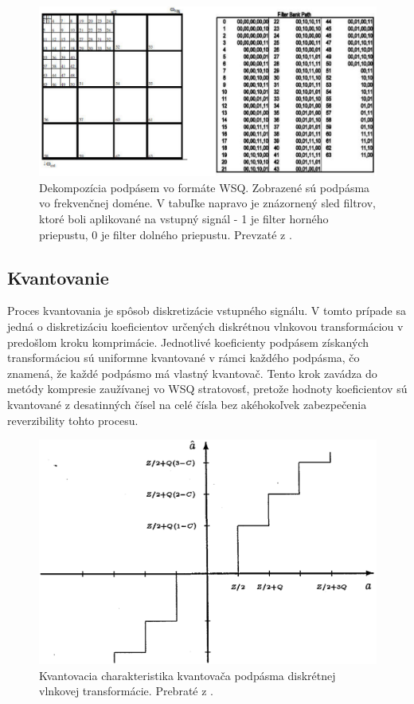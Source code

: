   \begin{figure}[h]
    \centering
    \includegraphics[width=0.8\linewidth]{obrazky-figures/WSQ_DWT_subband_decomposition.png}
    \caption{Dekompozícia podpásem vo formáte WSQ. Zobrazené sú podpásma vo frekvenčnej doméne. V tabuľke napravo je znázornený sled filtrov, ktoré boli
    aplikované na vstupný signál - 1 je filter horného priepustu, 0 je filter dolného priepustu. Prevzaté z \cite{WSQSpecification}.}
    \label{obr:WSQ_DWT_dekompozicia}
  \end{figure}

  \subsection{Kvantovanie}
  Proces kvantovania je spôsob diskretizácie vstupného signálu. V tomto prípade sa jedná o diskretizáciu koeficientov určených diskrétnou vlnkovou
  transformáciou v predošlom kroku komprimácie. Jednotlivé koeficienty podpásem získaných transformáciou sú uniformne kvantované v rámci každého podpásma,
  čo znamená, že každé podpásmo má vlastný kvantovač. Tento krok zavádza do metódy kompresie zaužívanej vo WSQ stratovosť, pretože hodnoty koeficientov
  sú kvantované z desatinných čísel na celé čísla bez akéhokoľvek zabezpečenia reverzibility tohto procesu.

  \begin{figure}[h]
    \centering
    \includegraphics[width=0.6\linewidth]{obrazky-figures/wsq_kvantovacia_charakteristika.png}
    \caption{Kvantovacia charakteristika kvantovača podpásma diskrétnej vlnkovej transformácie. Prebraté z \cite{brislawn1996compression}.}
    \label{obr:wsq_kvantovacia_charakteristika}
  \end{figure}

